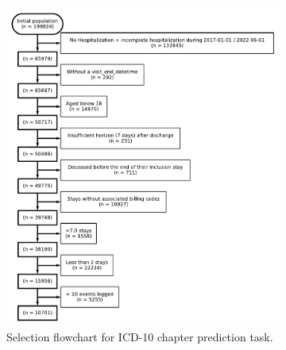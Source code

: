 \documentclass[french,12pt,twoside,a4paper]{book}
\begin{document}
\begin{appendices}
\begin{figure}[!h]
\begin{subfigure}[b]{0.5\textwidth}
      \includegraphics[width=1.1\textwidth]{img/chapter_3/flowchart_t2_icd10.pdf}
      \caption{Selection flowchart for ICD-10 chapter prediction task.}
      \label{apd:fig:flowchart_t2}
    \end{subfigure}
    \vfill
    \begin{subfigure}[b]{0.5\textwidth}
      \centering

\end{subfigure}
\end{figure}
\end{appendices}
\end{document}
